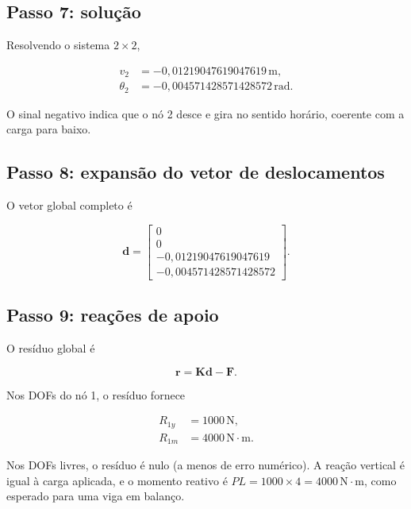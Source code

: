 \documentclass[12pt,a4paper]{article}
\newcommand{\unit}[1]{\,\mathrm{#1}}
\begin{document}
\subsection{Passo 7: solução}

Resolvendo o sistema \(2\times2\),

\begin{align}
  v_2 &= -0{,}01219047619047619\unit{m}, \label{eq:ex_v2}\\
  \theta_2 &= -0{,}004571428571428572\unit{rad}. \label{eq:ex_theta2}
\end{align}

O sinal negativo indica que o nó 2 desce e gira no sentido horário, coerente com a carga para baixo.

\subsection{Passo 8: expansão do vetor de deslocamentos}

O vetor global completo é

\begin{equation}
  \mathbf{d} =
  \begin{bmatrix}
    0\\0\\-0{,}01219047619047619\\-0{,}004571428571428572
  \end{bmatrix}.
  \label{eq:ex_dfull}
\end{equation}

\subsection{Passo 9: reações de apoio}

O resíduo global é

\begin{equation}
  \mathbf{r} = \mathbf{K}\mathbf{d}-\mathbf{F}.
  \label{eq:ex_residual}
\end{equation}

Nos DOFs do nó 1, o resíduo fornece

\begin{align}
  R_{1y} &= 1000\unit{N}, \label{eq:ex_Ry}\\
  R_{1m} &= 4000\unit{N\cdot m}. \label{eq:ex_Rm}
\end{align}

Nos DOFs livres, o resíduo é nulo (a menos de erro numérico). A reação vertical é igual à carga aplicada, e o momento reativo é \(PL=1000\times4=4000\unit{N\cdot m}\), como esperado para uma viga em balanço.
\end{document}
